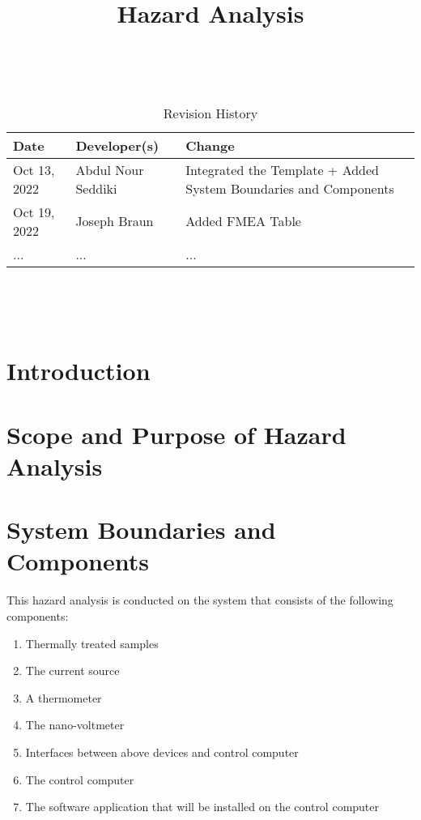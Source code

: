 \documentclass{article}
\title{Hazard Analysis\\\progname}
\author{\authname}
\date{}
\begin{document}
\maketitle
\thispagestyle{empty}

~\newpage


\begin{table}[hp]
\caption{Revision History} \label{TblRevisionHistory}
\begin{tabularx}{\textwidth}{llX}
\toprule
\textbf{Date} & \textbf{Developer(s)} & \textbf{Change}\\
\midrule
Oct 13, 2022 & Abdul Nour Seddiki & Integrated the Template + Added System Boundaries and Components\\
Oct 19, 2022 & Joseph Braun & Added FMEA Table\\
... & ... & ...\\
\bottomrule
\end{tabularx}
\end{table}

~\newpage

\tableofcontents

~\newpage



\section{Introduction}


\section{Scope and Purpose of Hazard Analysis}

\section{System Boundaries and Components}

\noindent This hazard analysis is conducted on the system that consists of the following components:

\begin{enumerate}
  \item Thermally treated samples
  \item The current source
  \item A thermometer
  \item The nano-voltmeter
  \item Interfaces between above devices and control computer
  \item The control computer
  \item The software application that will be installed on the control computer
\end{enumerate}
\end{document}
